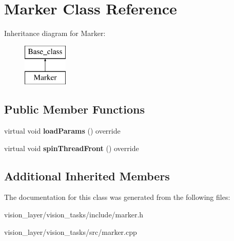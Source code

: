 \hypertarget{classMarker}{}\section{Marker Class Reference}
\label{classMarker}
Inheritance diagram for Marker\+:\begin{figure}[H]
\begin{center}
\leavevmode
\includegraphics[height=2.000000cm]{classMarker}
\end{center}
\end{figure}
\subsection*{Public Member Functions}
\begin{DoxyCompactItemize}
\item 
\mbox{\label{classMarker_abc52521edfd9dabe076335512ee7140c}} 
virtual void {\bfseries load\+Params} () override
\item 
\mbox{\label{classMarker_a3be6e77f4a71adc218ad1a66973f2277}} 
virtual void {\bfseries spin\+Thread\+Front} () override
\end{DoxyCompactItemize}
\subsection*{Additional Inherited Members}


The documentation for this class was generated from the following files\+:\begin{DoxyCompactItemize}
\item 
vision\+\_\+layer/vision\+\_\+tasks/include/marker.\+h\item 
vision\+\_\+layer/vision\+\_\+tasks/src/marker.\+cpp\end{DoxyCompactItemize}
